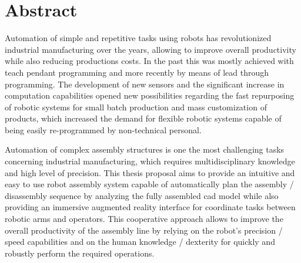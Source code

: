 \chapter*{Abstract}

Automation of simple and repetitive tasks using robots has revolutionized industrial manufacturing over the years, allowing to improve overall productivity while also reducing productions costs. In the past this was mostly achieved with teach pendant programming and more recently by means of lead through programming. The development of new sensors and the significant increase in computation capabilities opened new possibilities regarding the fast repurposing of robotic systems for small batch production and mass customization of products, which increased the demand for flexible robotic systems capable of being easily re-programmed by non-technical personal.

Automation of complex assembly structures is one the most challenging tasks concerning industrial manufacturing, which requires multidisciplinary knowledge and high level of precision. This thesis proposal aims to provide an intuitive and easy to use robot assembly system capable of automatically plan the assembly / disassembly sequence by analyzing the fully assembled \gls{cad} model while also providing an immersive augmented reality interface for coordinate tasks between robotic arms and operators. This cooperative approach  allows to improve the overall productivity of the assembly line by relying on the robot's precision / speed capabilities and on the human knowledge / dexterity for quickly and robustly perform the required operations.

